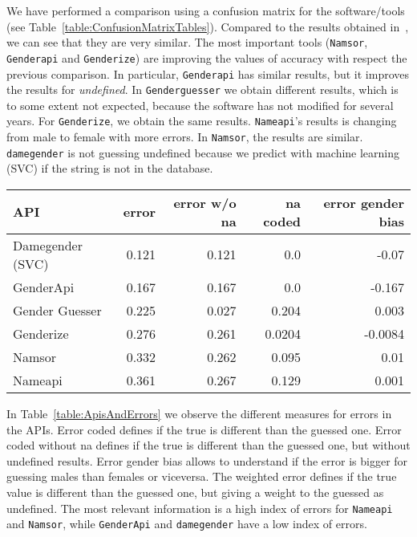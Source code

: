 \documentclass[a4paper]{article}
\begin{document}
We have performed a comparison using a confusion matrix for the software/tools (see Table~\ref{table:ConfusionMatrixTables}).
Compared to the results obtained in~\cite{10.7717/peerj-cs.156}, we can see that they are very similar.
The most important tools (\texttt{Namsor}, \texttt{Genderapi} and \texttt{Genderize}) are improving the values of accuracy with respect the previous comparison.
In particular, \texttt{Genderapi} has similar results, but it improves the results for \emph{undefined}.
In \texttt{Genderguesser} we obtain different results, which is to some extent not expected, because the software has not modified for several years.
For \texttt{Genderize}, we obtain the same results. 
\texttt{Nameapi}'s results is changing from male to female with more errors. 
In \texttt{Namsor}, the results are similar. 
\texttt{damegender} is not guessing undefined because we predict with machine learning (SVC) if the string is not in the database.

\begin{table*}
\footnotesize
\center
\begin{tabular}[]{lrrrr}
\hline
API & error & error w/o na & na coded & error gender bias\tabularnewline
\hline
Damegender (SVC)\footnotemark[1] & 0.121 & 0.121 & 0.0 & -0.07\tabularnewline
GenderApi & 0.167 & 0.167 & 0.0 & -0.167\tabularnewline
Gender Guesser & 0.225 & 0.027 & 0.204 & 0.003\tabularnewline
Genderize & 0.276 & 0.261 & 0.0204 & -0.0084 \tabularnewline 
Namsor & 0.332 & 0.262 & 0.095 & 0.01 \tabularnewline
Nameapi & 0.361 & 0.267 & 0.129 & 0.001 \tabularnewline
\hline
\end{tabular}
\caption{APIs and Errors}
\vspace{0.3cm}
\label{table:ApisAndErrors}
\end{table*}


In Table~\ref{table:ApisAndErrors} we observe the different measures for errors in the APIs.
Error coded defines if the true is different than the guessed one. 
Error coded without na defines if the true is different than the guessed one, but without undefined results.
Error gender bias allows to understand if the error is bigger for guessing males than females or viceversa.
The weighted error defines if the true value is different than the guessed one, but giving a weight to the guessed as undefined.
The most relevant information is a high index of errors for \texttt{Nameapi} and \texttt{Namsor},
while \texttt{GenderApi} and \texttt{damegender} have a low index of errors.
\end{document}

